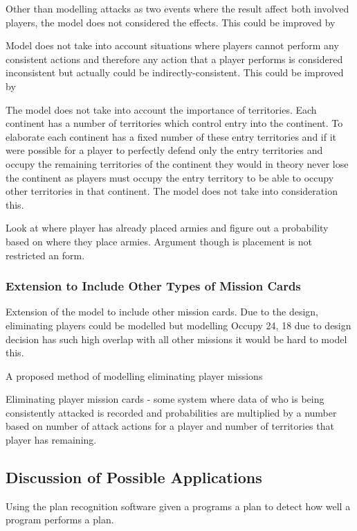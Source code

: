 \documentclass[parskip]{cs4rep}
\begin{document}
Other than modelling attacks as two events where the result affect both involved players, the model does not considered the effects. This could be improved by

Model does not take into account situations where players cannot perform any consistent actions and therefore any action that a player performs is considered inconsistent but actually could be indirectly-consistent. This could be improved by

The model does not take into account the importance of territories. Each continent has a number of territories which control entry into the continent. To elaborate each continent has a fixed number of these entry territories and if it were possible for a player to perfectly defend only the entry territories and occupy the remaining territories of the continent they would in theory never lose the continent as players must occupy the entry territory to be able to occupy other territories in that continent. The model does not take into consideration this.

Look at where player has already placed armies and figure out a probability based on where they place armies. Argument though is placement is not restricted an form.

\subsubsection{Extension to Include Other Types of Mission Cards}

Extension of the model to include other mission cards. Due to the design, eliminating players could be modelled but modelling Occupy 24, 18 due to design decision has such high overlap with all other missions it would be hard to model this.

A proposed method of modelling eliminating player missions

Eliminating player mission cards - some system where data of who is being consistently attacked is recorded and probabilities are multiplied by a number based on number of attack actions for a player and number of territories that player has remaining.

\subsection{Discussion of Possible Applications}

Using the plan recognition software given a programs a plan to detect how well a program performs a plan. 
\end{document}

